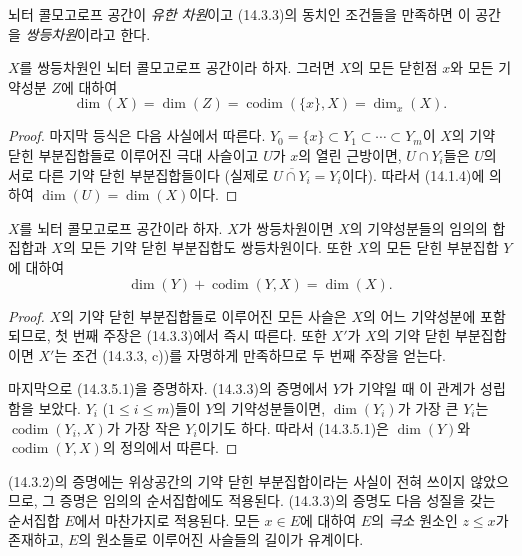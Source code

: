 뇌터 콜모고로프 공간이 \emph{유한 차원}이고 (14.3.3)의 동치인 조건들을
만족하면 이 공간을 \emph{쌍등차원}이라고 한다.

\begin{corollary}[14.3.4]
\label{0.14.3.4-fr}
$X$를 쌍등차원인 뇌터 콜모고로프 공간이라 하자. 그러면 $X$의 모든
닫힌점 $x$와 모든 기약성분 $Z$에 대하여
\[
  \dim(X)=\dim(Z)=\operatorname{codim}(\{x\},X)=\dim_x(X).
  \tag{14.3.4.1}\label{0.14.3.4.1-fr}
\]
\end{corollary}

\begin{proof}
마지막 등식은 다음 사실에서 따른다. $Y_0=\{x\}\subset Y_1\subset
\cdots\subset Y_m$이 $X$의 기약 닫힌 부분집합들로 이루어진 극대
사슬이고 $U$가 $x$의 열린 근방이면, $U\cap Y_i$들은 $U$의 서로 다른
기약 닫힌 부분집합들이다 (실제로 $\overline{U\cap Y_i}=Y_i$이다).
따라서 (14.1.4)에 의하여 $\dim(U)=\dim(X)$이다.
\end{proof}

\begin{corollary}[14.3.5]
\label{0.14.3.5-fr}
$X$를 뇌터 콜모고로프 공간이라 하자. $X$가 쌍등차원이면 $X$의
기약성분들의 임의의 합집합과 $X$의 모든 기약 닫힌 부분집합도
쌍등차원이다. 또한 $X$의 모든 닫힌 부분집합 $Y$에 대하여
\[
  \dim(Y)+\operatorname{codim}(Y,X)=\dim(X).
  \tag{14.3.5.1}\label{0.14.3.5.1-fr}
\]
\end{corollary}

\begin{proof}
$X$의 기약 닫힌 부분집합들로 이루어진 모든 사슬은 $X$의 어느
기약성분에 포함되므로, 첫 번째 주장은 (14.3.3)에서 즉시 따른다. 또한
$X'$가 $X$의 기약 닫힌 부분집합이면 $X'$는 조건 (14.3.3, c))를
자명하게 만족하므로 두 번째 주장을 얻는다.

마지막으로 (14.3.5.1)을 증명하자. (14.3.3)의 증명에서 $Y$가 기약일
때 이 관계가 성립함을 보았다. $Y_i$ ($1\leq i\leq m$)들이 $Y$의
기약성분들이면, $\dim(Y_i)$가 가장 큰 $Y_i$는
$\operatorname{codim}(Y_i,X)$가 가장 작은 $Y_i$이기도 하다. 따라서
(14.3.5.1)은 $\dim(Y)$와 $\operatorname{codim}(Y,X)$의 정의에서
따른다.
\end{proof}

\begin{remark}[14.3.6]
\label{0.14.3.6-fr}
(14.3.2)의 증명에는 위상공간의 기약 닫힌 부분집합이라는 사실이 전혀
쓰이지 않았으므로, 그 증명은 임의의 순서집합에도 적용된다. (14.3.3)의
증명도 다음 성질을 갖는 순서집합 $E$에서 마찬가지로 적용된다. 모든
$x\in E$에 대하여 $E$의 \emph{극소} 원소인 $z\leq x$가 존재하고,
$E$의 원소들로 이루어진 사슬들의 길이가 유계이다.
\end{remark}

